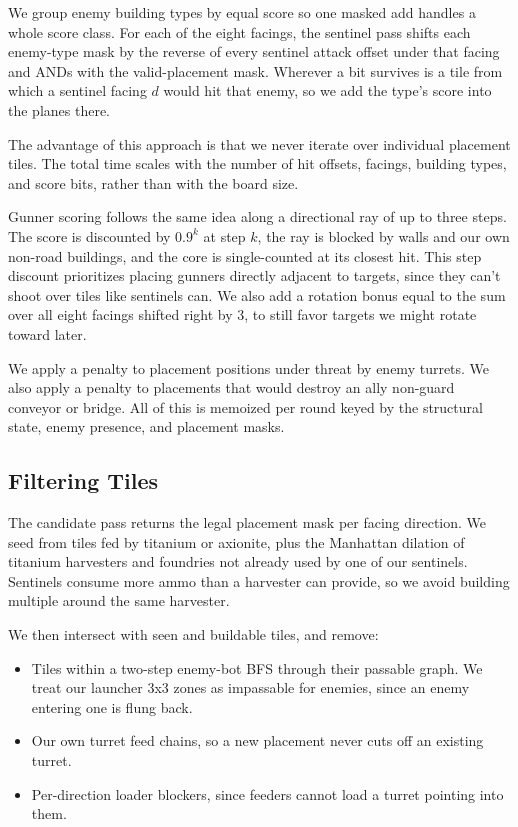 \documentclass[10pt,sigconf,nonacm]{acmart}
\begin{document}
We group enemy building types by equal score so one masked add handles a whole score class. For each of the eight facings, the sentinel pass shifts each enemy-type mask by the reverse of every sentinel attack offset under that facing and ANDs with the valid-placement mask. Wherever a bit survives is a tile from which a sentinel facing $d$ would hit that enemy, so we add the type's score into the planes there.

The advantage of this approach is that we never iterate over individual placement tiles. The total time scales with the number of hit offsets, facings, building types, and score bits, rather than with the board size.

Gunner scoring follows the same idea along a directional ray of up to three steps. The score is discounted by $0.9^k$ at step $k$, the ray is blocked by walls and our own non-road buildings, and the core is single-counted at its closest hit. This step discount prioritizes placing gunners directly adjacent to targets, since they can't shoot over tiles like sentinels can. We also add a rotation bonus equal to the sum over all eight facings shifted right by 3, to still favor targets we might rotate toward later.

We apply a penalty to placement positions under threat by enemy turrets. We also apply a penalty to placements that would destroy an ally non-guard conveyor or bridge. All of this is memoized per round keyed by the structural state, enemy presence, and placement masks.

\subsection{Filtering Tiles}

The candidate pass returns the legal placement mask per facing direction. We seed from tiles fed by titanium or axionite, plus the Manhattan dilation of titanium harvesters and foundries not already used by one of our sentinels. Sentinels consume more ammo than a harvester can provide, so we avoid building multiple around the same harvester.

We then intersect with seen and buildable tiles, and remove:

\begin{itemize}[leftmargin=*]
  \item Tiles within a two-step enemy-bot BFS through their passable graph. We treat our launcher 3x3 zones as impassable for enemies, since an enemy entering one is flung back.
  \item Our own turret feed chains, so a new placement never cuts off an existing turret.
  \item Per-direction loader blockers, since feeders cannot load a turret pointing into them.
\end{itemize}
\end{document}
